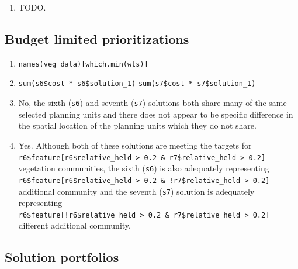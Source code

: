 \documentclass[12pt,]{book}
\providecommand{\tightlist}{%
  \setlength{\itemsep}{0pt}\setlength{\parskip}{0pt}}
\let\BeginKnitrBlock\begin \let\EndKnitrBlock\end
\begin{document}
\BeginKnitrBlock{rmdanswer}
\begin{enumerate}
\def\labelenumi{\arabic{enumi}.}
\tightlist
\item
  TODO.
\end{enumerate}
\EndKnitrBlock{rmdanswer}

\subsection{Budget limited
prioritizations}\label{budget-limited-prioritizations-1}

\BeginKnitrBlock{rmdanswer}
\begin{enumerate}
\def\labelenumi{\arabic{enumi}.}
\tightlist
\item
  \texttt{names(veg\_data){[}which.min(wts){]}}
\item
  \texttt{sum(s6\$cost\ *\ s6\$solution\_1)} \newline
   \texttt{sum(s7\$cost\ *\ s7\$solution\_1)}
\item
  No, the sixth (\texttt{s6}) and seventh (\texttt{s7}) solutions both
  share many of the same selected planning units and there does not
  appear to be specific difference in the spatial location of the
  planning units which they do not share.
\item
  Yes. Although both of these solutions are meeting the targets for
  \texttt{r6\$feature{[}r6\$relative\_held\ \textgreater{}\ 0.2\ \&\ r7\$relative\_held\ \textgreater{}\ 0.2{]}}
  vegetation communities, the sixth (\texttt{s6}) is also adequately
  representing
  \texttt{r6\$feature{[}r6\$relative\_held\ \textgreater{}\ 0.2\ \&\ !r7\$relative\_held\ \textgreater{}\ 0.2{]}}
  additional community and the seventh (\texttt{s7}) solution is
  adequately representing
  \texttt{r6\$feature{[}!r6\$relative\_held\ \textgreater{}\ 0.2\ \&\ r7\$relative\_held\ \textgreater{}\ 0.2{]}}
  different additional community.
\end{enumerate}
\EndKnitrBlock{rmdanswer}

\subsection{Solution portfolios}\label{solution-portfolios-1}
\end{document}
